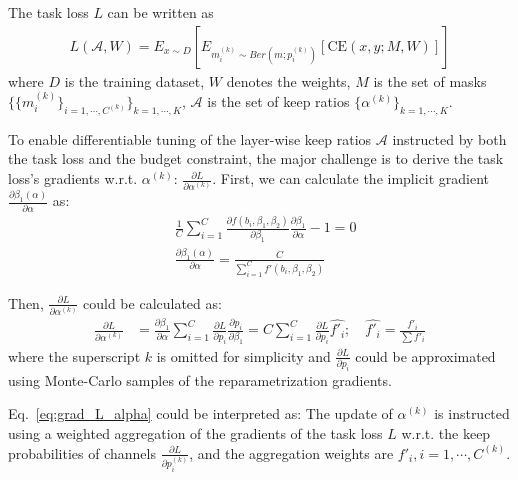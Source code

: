 \documentclass[runningheads]{llncs}
\newcommand{\alphas}{\mathcal{A}}
\begin{document}
  The task loss $L$ can be written as
  \begin{equation}
      \begin{aligned}
      L(\alphas, W) = E_{x \sim D} [E_{m^{(k)}_i \sim Ber(m; p^{(k)}_i)}[\mbox{CE}(x, y; M, W)]]
      \end{aligned}
  \end{equation}
  where $D$ is the training dataset, $W$ denotes the weights, $M$ is the set of masks $\{\{m^{(k)}_i\}_{i=1,\cdots,C^{(k)}}\}_{k=1,\cdots, K}$, $\alphas$ is the set of keep ratios $\{\alpha^{(k)}\}_{k=1,\cdots,K}$. 
  
  To enable differentiable tuning of the layer-wise keep ratios $\alphas$ instructed by both the task loss and the budget constraint,
  the major challenge is to derive the task loss's gradients w.r.t. $\alpha^{(k)}$: $\frac{\partial L}{\partial \alpha^{(k)}}$. First, we can calculate the implicit gradient $\frac{\partial \beta_1(\alpha)}{\partial \alpha}$ as:
  \begin{equation}
    \begin{aligned}
      &\frac{1}{C} \sum_{i=1}^{C} \frac{\partial f(b_i, \beta_1, \beta_2)}{\partial \beta_1} \frac{\partial \beta_1}{\partial \alpha} - 1 = 0\\
      &\frac{\partial \beta_1(\alpha)}{\partial \alpha}  = \frac{C}{\sum^{C}_{i=1}f'(b_i, \beta_1, \beta_2)}
    \end{aligned}
    \label{eq:grad_beta1_alpha}
  \end{equation}
  
  Then, $\frac{\partial L}{\partial \alpha^{(k)}}$ could be calculated as:
  \begin{equation}
    \begin{aligned}
      \frac{\partial L}{\partial \alpha^{(k)}} &= \frac{\partial \beta_1}{\partial \alpha} \sum_{i=1}^{C} \frac{\partial L}{\partial p_i} \frac{\partial p_i}{\partial \beta_1} = C \sum_{i=1}^{C} \frac{\partial L}{\partial p_i}  \hat{f'_i};\quad \hat{f'_i} = \frac{f'_i}{\sum f'_i}
    \end{aligned}
    \label{eq:grad_L_alpha}
  \end{equation}
  where the superscript $k$ is omitted for simplicity and $\frac{\partial L}{\partial p_i}$ could be approximated using Monte-Carlo samples of the reparametrization gradients. 
    
  Eq.~\ref{eq:grad_L_alpha} could be interpreted as: 
  The update of $\alpha^{(k)}$ is instructed using a weighted aggregation of the gradients of the task loss $L$ w.r.t. the keep probabilities of channels $\frac{\partial L}{\partial p^{(k)}_i}$, and the aggregation weights are $f'_i, i=1,\cdots,C^{(k)}$.
  
\end{document}
